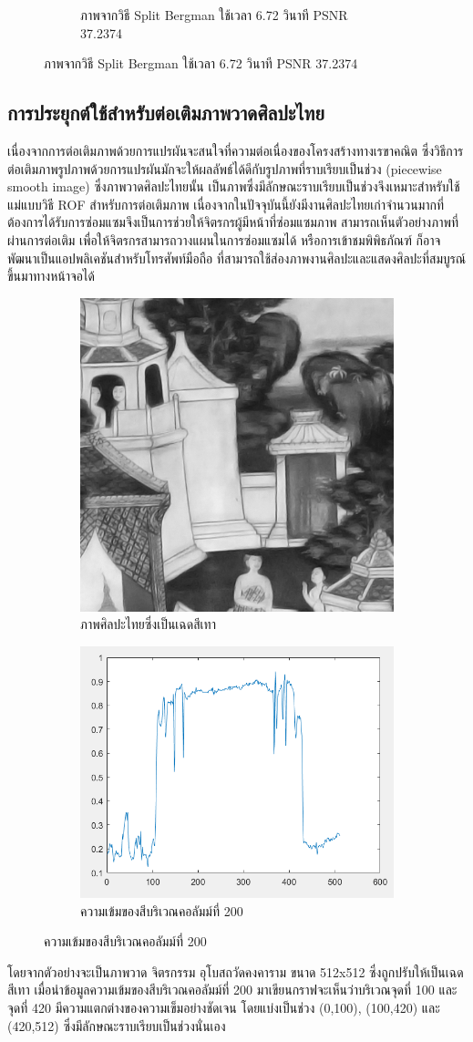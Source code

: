 \documentclass[hidelinks,a4paper,14pt]{article}
\numberwithin{equation}{section}							%
\begin{document}
{\begin{figure}[H]
\begin{subfigure}{0.4\linewidth}
					\caption{ภาพจากวิธี Split Bergman ใช้เวลา 6.72 วินาที PSNR 37.2374}
				\end{subfigure}
			\end{figure}
			
			\subsection{การประยุกต์ใช้สำหรับต่อเติมภาพวาดศิลปะไทย}
			
			\hspace{0.85cm}เนื่องจากการต่อเติมภาพด้วยการแปรผันจะสนใจที่ความต่อเนื่องของโครงสร้างทางเรขาคณิต ซึ่งวิธีการต่อเติมภาพรูปภาพด้วยการแปรผันมักจะให้ผลลัพธ์ได้ดีกับรูปภาพที่ราบเรียบเป็นช่วง (piecewise smooth image) \cite{ref:defination-of-variation-inpaint}  ซึ่งภาพวาดศิลปะไทยนั้น เป็นภาพซึ่งมีลักษณะราบเรียบเป็นช่วงจึงเหมาะสำหรับใช้แม่แบบวิธี ROF สำหรับการต่อเติมภาพ เนื่องจากในปัจจุบันนี้ยังมีงานศิลปะไทยเก่าจำนวนมากที่ต้องการได้รับการซ่อมแซมจึงเป็นการช่วยให้จิตรกรผู้มีหน้าที่ซ่อมแซมภาพ สามารถเห็นตัวอย่างภาพที่ผ่านการต่อเติม เพื่อให้จิตรกรสามารถวางแผนในการซ่อมแซมได้ หรือการเข้าชมพิพิธภัณฑ์ ก็อาจพัฒนาเป็นแอปพลิเคชันสำหรับโทรศัพท์มือถือ ที่สามารถใช้ส่องภาพงานศิลปะและแสดงศิลปะที่สมบูรณ์ขึ้นมาทางหน้าจอได้
			\begin{figure}[H]
				\centering
				\begin{subfigure}{0.4\linewidth}
					\centering
					\includegraphics[width=0.4\linewidth]{images/show_peicewise/thaiart_gray.png}
					\caption{ภาพศิลปะไทยซึ่งเป็นเฉดสีเทา}
				\end{subfigure}
				\begin{subfigure}{0.4\linewidth}
					\centering
					\includegraphics[width=0.4\linewidth]{images/show_peicewise/thaiart_is_piecewise.png}
					\caption{ความเข้มของสีบริเวณคอลัมม์ที่ 200}
				\end{subfigure}				
			\end{figure}
			โดยจากตัวอย่างจะเป็นภาพวาด จิตรกรรม อุโบสถวัดคงคาราม ขนาด 512x512 ซึ่งถูกปรับให้เป็นเฉดสีเทา เมื่อนำข้อมูลความเข้มของสีบริเวณคอลัมม์ที่ 200 มาเขียนกราฟจะเห็นว่าบริเวณจุดที่ 100 และจุดที่ 420 มีความแตกต่างของความเข็มอย่างชัดเจน โดยแบ่งเป็นช่วง (0,100), (100,420) และ (420,512) ซึ่งมีลักษณะราบเรียบเป็นช่วงนั่นเอง
				
}
\end{document}
